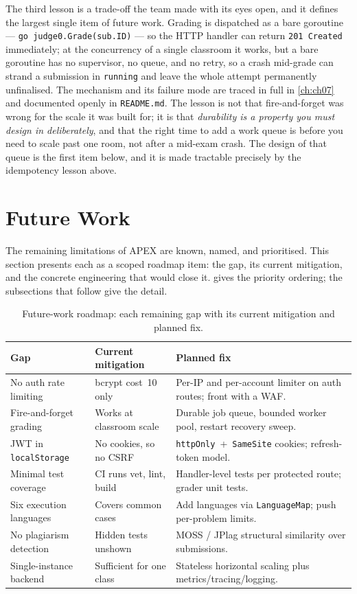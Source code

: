 The third lesson is a trade-off the team made with its eyes open, and it defines
the largest single item of future work. Grading is dispatched as a bare
goroutine --- \texttt{go judge0.Grade(sub.ID)} --- so the HTTP handler can return
\texttt{201 Created} immediately; at the concurrency of a single classroom it
works, but a bare goroutine has no supervisor, no queue, and no retry, so a crash
mid-grade can strand a submission in \texttt{running} and leave the whole attempt
permanently unfinalised. The mechanism and its failure mode are traced in full in
\cref{ch:ch07} and documented openly in \texttt{README.md}. The lesson is not that
fire-and-forget was wrong for the scale it was built for; it is that
\emph{durability is a property you must design in deliberately}, and that the
right time to add a work queue is before you need to scale past one room, not
after a mid-exam crash. The design of that queue is the first item below, and
it is made tractable precisely by the idempotency lesson above.

\section{Future Work}\label{sec:future}

The remaining limitations of APEX are known, named, and prioritised. This
section presents each as a scoped roadmap item: the gap, its current
mitigation, and the concrete engineering that would close it.
 gives the priority ordering; the subsections that follow
give the detail.

\begin{table}[htbp]
\centering
\caption{Future-work roadmap: each remaining gap with its current mitigation and
planned fix.}
\label{tab:roadmap}
\begin{tabularx}{\linewidth}{@{}L{3.0cm}L{3.6cm}X@{}}
\toprule
\textbf{Gap} & \textbf{Current mitigation} & \textbf{Planned fix} \\
\midrule
No auth rate limiting &
bcrypt cost~10 only &
Per-IP and per-account limiter on auth routes; front with a WAF. \\
Fire-and-forget grading &
Works at classroom scale &
Durable job queue, bounded worker pool, restart recovery sweep. \\
JWT in \texttt{localStorage} &
No cookies, so no CSRF &
\texttt{httpOnly}~+~\texttt{SameSite} cookies; refresh-token model. \\
Minimal test coverage &
CI runs vet, lint, build &
Handler-level tests per protected route; grader unit tests. \\
Six execution languages &
Covers common cases &
Add languages via \texttt{LanguageMap}; push per-problem limits. \\
No plagiarism detection &
Hidden tests unshown &
MOSS / JPlag structural similarity over submissions. \\
Single-instance backend &
Sufficient for one class &
Stateless horizontal scaling plus metrics/tracing/logging. \\
\bottomrule
\end{tabularx}
\end{table}


